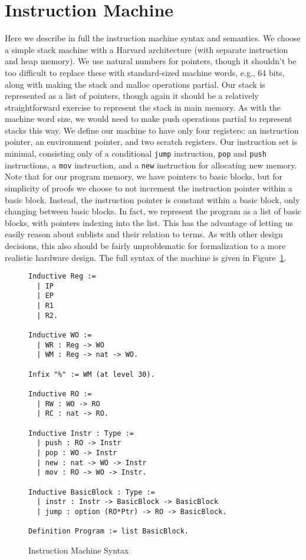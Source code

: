 \section{Instruction Machine} \label{sec:im_semantics}

Here we describe in full the instruction machine syntax and semantics. We
choose a simple stack machine with a Harvard architecture (with separate
instruction and heap memory). We use natural numbers for pointers, though it
shouldn't be too difficult to replace these with standard-sized machine words,
e.g., 64 bits, along with making the stack and malloc operations partial. Our
stack is represented as a list of pointers, though again it should be a
relatively straightforward exercise to represent the stack in main memory. As
with the machine word size, we would need to make push operations partial to
represent stacks this way. We define our machine to have only four registers: an
instruction pointer, an environment pointer, and two scratch registers. Our
instruction set is minimal, consisting only of a conditional \texttt{jump}
instruction, \texttt{pop} and \texttt{push} instructions, a \texttt{mov}
instruction, and a \texttt{new} instruction for allocating new memory. Note that
for our program memory, we have pointers to basic blocks, but for simplicity of
proofs we choose to not increment the instruction pointer within a basic block.
Instead, the instruction pointer is constant within a basic block, only changing
between basic blocks. In fact, we represent the program as a list of basic
blocks, with pointers indexing into the list. This has the advantage of letting
us easily reason about sublists and their relation to terms. As with other
design decisions, this also should be fairly unproblematic for formalization to
a more realistic hardware design. The full syntax of the machine is given in
Figure~\ref{fig:im_syntax}.  

\begin{figure}
\begin{lstlisting}
Inductive Reg := 
  | IP
  | EP
  | R1
  | R2.

Inductive WO := 
  | WR : Reg -> WO
  | WM : Reg -> nat -> WO.

Infix "%" := WM (at level 30).

Inductive RO := 
  | RW : WO -> RO
  | RC : nat -> RO.

Inductive Instr : Type :=
  | push : RO -> Instr
  | pop : WO -> Instr
  | new : nat -> WO -> Instr 
  | mov : RO -> WO -> Instr.

Inductive BasicBlock : Type :=
  | instr : Instr -> BasicBlock -> BasicBlock
  | jump : option (RO*Ptr) -> RO -> BasicBlock.

Definition Program := list BasicBlock.
\end{lstlisting}
\caption{Instruction Machine Syntax}
\label{fig:im_syntax}
\end{figure}

